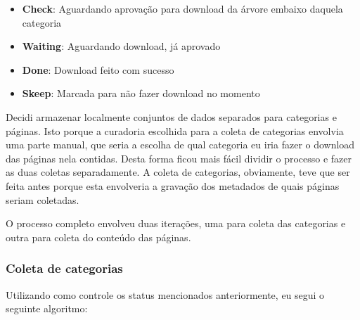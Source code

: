 \begin{itemize}
    \item \textbf{Check}: Aguardando aprovação para download da árvore embaixo daquela categoria
    \item \textbf{Waiting}: Aguardando download, já aprovado
    \item \textbf{Done}: Download feito com sucesso
    \item \textbf{Skeep}: Marcada para não fazer download no momento
\end{itemize}

Decidi armazenar localmente conjuntos de dados separados para categorias e páginas. Isto porque a curadoria escolhida para a coleta
de categorias envolvia uma parte manual, que seria a escolha de qual categoria eu iria fazer o download das páginas nela contidas. Desta 
forma ficou mais fácil dividir o processo e fazer as duas coletas separadamente. A coleta de categorias, obviamente, teve que ser feita antes 
porque esta envolveria a gravação dos metadados de quais páginas seriam coletadas.

O processo completo envolveu duas iterações, uma para coleta das categorias e outra para coleta do conteúdo das páginas.

\subsubsection{Coleta de categorias}

Utilizando como controle os status mencionados anteriormente, eu segui o seguinte algoritmo: 

